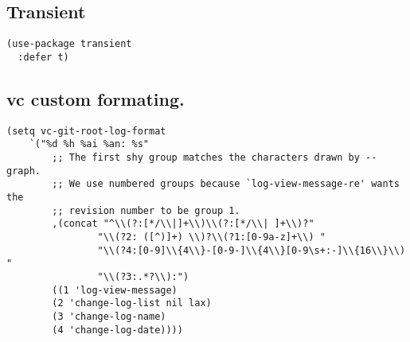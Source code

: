 \documentclass[11pt]{article}
\begin{document}
\subsection{Transient}
\label{sec:org40a9c66}
\begin{verbatim}
(use-package transient
  :defer t)
\end{verbatim}
\subsection{vc custom formating.}
\label{sec:org9e5eca7}
\begin{verbatim}
(setq vc-git-root-log-format
    `("%d %h %ai %an: %s"
        ;; The first shy group matches the characters drawn by --graph.
        ;; We use numbered groups because `log-view-message-re' wants the
        ;; revision number to be group 1.
        ,(concat "^\\(?:[*/\\|]+\\)\\(?:[*/\\| ]+\\)?"
                "\\(?2: ([^)]+) \\)?\\(?1:[0-9a-z]+\\) "
                "\\(?4:[0-9]\\{4\\}-[0-9-]\\{4\\}[0-9\s+:-]\\{16\\}\\) "
                "\\(?3:.*?\\):")
        ((1 'log-view-message)
        (2 'change-log-list nil lax)
        (3 'change-log-name)
        (4 'change-log-date))))
\end{verbatim}
\end{document}
